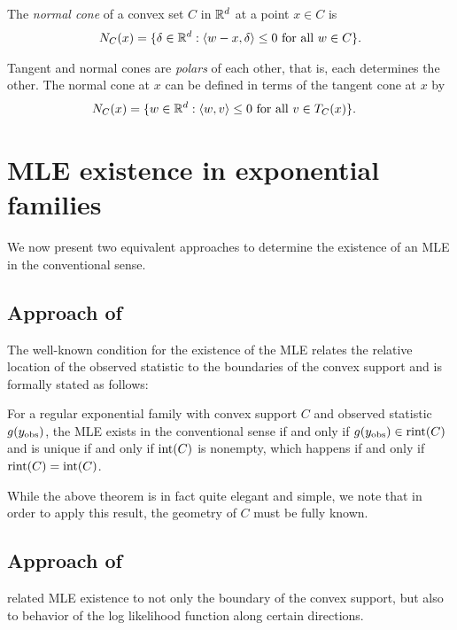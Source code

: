 The \emph{normal cone} of a convex set $C$ in ${\mathbb R}^d$ at a point $x \in C$ is 
\begin{align*}
	N_C(x) = \{ \delta \in {\mathbb R}^d: \langle w-x,\delta \rangle \leq 0 \text{ for all } w \in C 
\}.
\end{align*}

Tangent and normal cones are \emph{polars} of each other, that is, each determines the other.  
The normal cone at $x$ can be defined in terms of the tangent cone at $x$ by
\begin{align*}
	N_C(x) 	&= \{ w \in {\mathbb R}^d: \langle  w, v  \rangle \leq 0 \text{ for all } v \in T_C(x) \}.
\end{align*}




\section{MLE existence in exponential families}
We now present two equivalent approaches to determine the existence of an MLE
in the conventional sense.  

\subsection{Approach of \citet{Barndorff}}
The well-known condition for the existence of the MLE \citep{Barndorff, Brown:1986} 
relates the relative location of the observed statistic to the boundaries of 
the convex support and is formally stated as follows:
\begin{theorem} \label{Thm:MLE rint}
For a regular exponential family with convex support $C$ and observed statistic $g(y_{\text{obs}})$, the MLE exists in the conventional sense if and only if 
$g(y_{\text{obs}}) \in \operatorname{rint}(C)$ and is unique if and only if $\operatorname{int}(C)$ is nonempty, which
happens if and only if $\operatorname{rint}(C) = \operatorname{int}(C)$. 
\end{theorem}

While the above theorem is in fact quite elegant and simple, we note that in order to apply this result, the geometry of $C$ must be fully known.

\subsection{Approach of \citet{Geyer:gdor}}
\citet{Geyer:1990,Geyer:gdor} related MLE existence to
 not only the boundary of the convex support, but also to behavior of the log likelihood function along certain directions.


